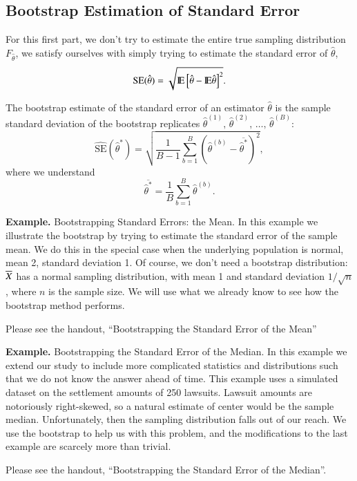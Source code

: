 \documentclass[captions=tableheading]{scrbook}
\begin{document}
\subsection{Bootstrap Estimation of Standard Error}
\label{sec-4_2_1}


For this first part, we don't try to estimate the entire true sampling distribution $F_{\hat{\theta}}$, we satisfy ourselves with simply trying to estimate the standard error of $\hat{\theta}$,
\[
\mathrm{SE}(\hat{\theta})=\sqrt{ \mathrm{I\hspace{-1.5pt}E} \left[\hat{\theta} - \mathrm{I\hspace{-1.5pt}E}\hat{\theta}  \right]^{2}}.
\]

The bootstrap estimate of the standard error of an estimator \(\hat{\theta}\) is the sample standard deviation of the bootstrap replicates \(\hat{\theta}^{(1)},\, \hat{\theta}^{(2)},\, \ldots,\,\hat{\theta}^{(B)}\):
\[
\widehat{\mathrm{SE}}(\hat{\theta}^{\ast})=\sqrt{\frac{1}{B-1}\sum_{b=1}^{B} \left( \hat{\theta}^{(b)} - \overline{\hat{\theta}^{\ast}} \right)^{2}},
\]
where we understand
\[
\overline{\hat{\theta}^{\ast}} = \frac{1}{B}\sum_{b=1}^{B} \hat{\theta}^{(b)}.
\]


\textbf{Example.} Bootstrapping Standard Errors: the Mean.  In this example we illustrate the bootstrap by trying to estimate the standard error of the sample mean. We do this in the special case when the underlying population is normal, mean 2, standard deviation 1. Of course, we don't need a bootstrap distribution: $\overline{X}$ has a normal sampling distribution, with mean 1 and standard deviation $1/\sqrt{n}$, where $n$ is the sample size. We will use what we already know to see how the bootstrap method performs.

Please see the handout, ``Bootstrapping the Standard Error of the Mean''




\textbf{Example.} Bootstrapping the Standard Error of the Median. In this example we extend our study to include more complicated statistics and distributions such that we do not know the answer ahead of time. This example uses a simulated dataset on the settlement amounts of 250 lawsuits. Lawsuit amounts are notoriously right-skewed, so a natural estimate of center would be the sample median. Unfortunately, then the sampling distribution falls out of our reach. We use the bootstrap to help us with this problem, and the modifications to the last example are scarcely more than trivial.

 

Please see the handout, ``Bootstrapping the Standard Error of the Median''.  
\end{document}
